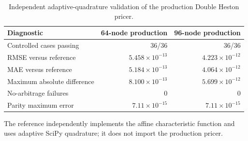 \begin{table}[htbp]
\centering
\caption{Independent adaptive-quadrature validation of the production Double Heston pricer.}
\label{tab:canonical-engine-benchmark}
\begin{tabular}{lrr}
\toprule
Diagnostic & 64-node production & 96-node production \\
\midrule
Controlled cases passing & 36/36 & 36/36 \\
RMSE versus reference & $5.458 \times 10^{-13}$ & $4.223 \times 10^{-12}$ \\
MAE versus reference & $5.184 \times 10^{-13}$ & $4.064 \times 10^{-12}$ \\
Maximum absolute difference & $8.100 \times 10^{-13}$ & $5.699 \times 10^{-12}$ \\
No-arbitrage failures & 0 & 0 \\
Parity maximum error & $7.11 \times 10^{-15}$ & $7.11 \times 10^{-15}$ \\
\bottomrule
\end{tabular}
\par\vspace{0.35em}
\begin{minipage}{0.94\linewidth}\small The reference independently implements the affine characteristic function and uses adaptive SciPy quadrature; it does not import the production pricer.\end{minipage}
\end{table}
